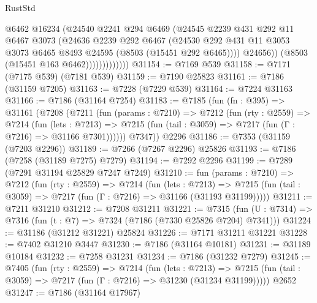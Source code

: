 \begin{lexlean}{RustStd}
\begin{coremodule}
                          @6462
                          @16234
                          (@24540
                            @2241
                            @294
                            @6469
                            (@24545
                              @2239
                              @431
                              @292
                              @11
                              @6467
                              @3073
                              (@24636
                                @2239
                                @292
                                @6467
                                (@24530
                                  @292
                                  @431
                                  @11
                                  @3053
                                  @3073
                                  @6465
                                  @8493
                                  @24595
                                  (@8503 (@15451 @292 @6465))))
                              @24656))
                          (@8503 (@15451 @163 @6462)))))))))))))
@31154 := @7169 @539
@31158 := @7171 (@7175 @539) (@7181 @539)
@31159 := @7190 @25823
@31161 := @7186 (@31159 @7205)
@31163 := @7228 (@7229 @539)
@31164 := @7224 @31163
@31166 := @7186 (@31164 @7254)
@31183 := @7185
    (fun (fn : @395) =>
    @31161
      (@7208
        (@7211
          (fun (params : @7210) =>
          @7212
            (fun (rty : @2559) =>
            @7214
              (fun (lets : @7213) =>
              @7215 (fun (tail : @3059) => @7217 (fun (Γ : @7216) => @31166 @7301))))))
        @7347))
    @2296
@31186 := @7353 (@31159 (@7203 @2296))
@31189 := @7266 (@7267 @2296) @25826
@31193 := @7186 (@7258 (@31189 @7275) @7279)
@31194 := @7292 @2296
@31199 := @7289 (@7291 @31194 @25829 @7247 @7249)
@31210 := fun (params : @7210) =>
  @7212
    (fun (rty : @2559) =>
    @7214
      (fun (lets : @7213) =>
      @7215 (fun (tail : @3059) => @7217 (fun (Γ : @7216) => @31166 (@31193 @31199)))))
@31211 := @7211 @31210
@31212 := @7208 @31211
@31221 := @7315
    (fun (U : @7314) => @7316 (fun (t : @7) => @7324 (@7186 (@7330 @25826 @7204) @7341)))
@31224 := @31186 (@31212 @31221) @25824
@31226 := @7171 @31211 @31221
@31228 := @7402 @31210 @3447
@31230 := @7186 (@31164 @10181)
@31231 := @31189 @10184
@31232 := @7258 @31231
@31234 := @7186 (@31232 @7279)
@31245 := @7405
    (fun (rty : @2559) =>
    @7214
      (fun (lets : @7213) =>
      @7215 (fun (tail : @3059) => @7217 (fun (Γ : @7216) => @31230 (@31234 @31199)))))
    @2652
@31247 := @7186 (@31164 @17967)

\end{coremodule}
\end{lexlean}
